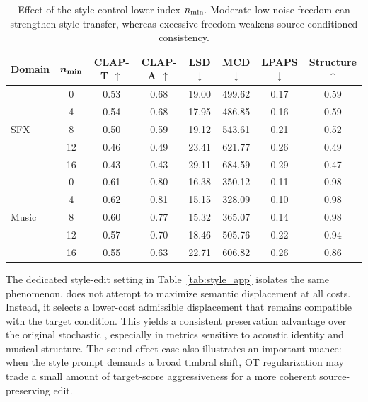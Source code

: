 \begin{table}[htpb]
    \centering
    \small
    \setlength{\tabcolsep}{4.5pt}
    \begin{tabular}{lccccccc}
        \toprule
        \textbf{Domain} & $\boldsymbol{n_{\min}}$ & \textbf{CLAP-T} $\uparrow$ & \textbf{CLAP-A} $\uparrow$ & \textbf{LSD} $\downarrow$ & \textbf{MCD} $\downarrow$ & \textbf{LPAPS} $\downarrow$ & \textbf{Structure} $\uparrow$ \\
        \midrule
        \multirow{5}{*}{SFX} & 0  & 0.53 & 0.68 & 19.00 & 499.62 & 0.17 & 0.59 \\
        & 4  & 0.54 & 0.68 & 17.95 & 486.85 & 0.16 & 0.59 \\
        & 8  & 0.50 & 0.59 & 19.12 & 543.61 & 0.21 & 0.52 \\
        & 12 & 0.46 & 0.49 & 23.41 & 621.77 & 0.26 & 0.49 \\
        & 16 & 0.43 & 0.43 & 29.11 & 684.59 & 0.29 & 0.47 \\
        \midrule
        \multirow{5}{*}{Music} & 0  & 0.61 & 0.80 & 16.38 & 350.12 & 0.11 & 0.98 \\
        & 4  & 0.62 & 0.81 & 15.15 & 328.09 & 0.10 & 0.98 \\
        & 8  & 0.60 & 0.77 & 15.32 & 365.07 & 0.14 & 0.98 \\
        & 12 & 0.57 & 0.70 & 18.46 & 505.76 & 0.22 & 0.94 \\
        & 16 & 0.55 & 0.63 & 22.71 & 606.82 & 0.26 & 0.86 \\
        \bottomrule
    \end{tabular}
    \caption{Effect of the style-control lower index $n_{\min}$. Moderate low-noise freedom can strengthen style transfer, whereas excessive freedom weakens source-conditioned consistency.}
    \label{tab:nmin_app}
\end{table}

The dedicated style-edit setting in Table~\ref{tab:style_app} isolates the same phenomenon.
\methodplus does not attempt to maximize semantic displacement at all costs.
Instead, it selects a lower-cost admissible displacement that remains compatible with the target condition.
This yields a consistent preservation advantage over the original stochastic \method, especially in metrics sensitive to acoustic identity and musical structure.
The sound-effect case also illustrates an important nuance: when the style prompt demands a broad timbral shift, OT regularization may trade a small amount of target-score aggressiveness for a more coherent source-preserving edit.

